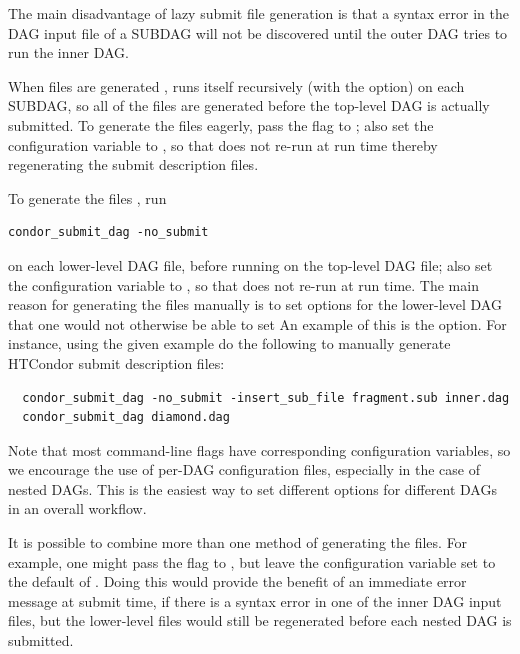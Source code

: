 \begin{itemize}
The main disadvantage of lazy submit file generation is that 
a syntax error in the DAG input file of a SUBDAG will not be discovered
until the outer DAG tries to run the inner DAG.

When  files are generated ,
 runs itself recursively (with the 
option) on each SUBDAG, so all of the  files
are generated before the top-level DAG is actually submitted.
To generate the  files eagerly, 
pass the  flag to ; 
also set the  configuration variable
to , so that  does not re-run
 at run time thereby regenerating 
the submit description files.

To generate the  files , 
run
\begin{verbatim}
condor_submit_dag -no_submit
\end{verbatim}
on each lower-level DAG file,
before running  on the top-level DAG file;
also set the 
configuration variable to ,
so that  does not re-run  at run time.
The main reason for
generating the  files manually is 
to set options
for the lower-level DAG that one would not otherwise be able to set
An  example of this is the   option.
For instance,
using the given example do the following to manually generate
HTCondor submit description files:

\footnotesize
\begin{verbatim}
  condor_submit_dag -no_submit -insert_sub_file fragment.sub inner.dag
  condor_submit_dag diamond.dag
\end{verbatim}
\normalsize

Note that most  command-line flags have
corresponding configuration variables, so we encourage the use of
per-DAG configuration files, especially in the case of nested DAGs.
This is the easiest way to set different options for different DAGs
in an overall workflow.

It is possible to combine more than one method of generating the
 files.
For example, one might pass the  flag to 
,
but leave the
 configuration variable set
to the default of .
Doing this would provide the benefit
of an immediate error message at submit time,
if there is a syntax error
in one of the inner DAG input files,
but the lower-level 
files would still be regenerated before each nested DAG is submitted.


\end{itemize}

